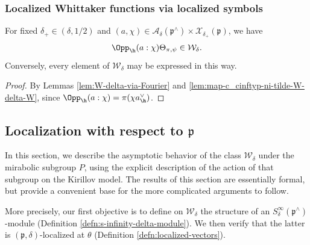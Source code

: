 \subsubsection{Localized Whittaker functions via localized symbols}

\begin{lemma}\label{lem:every-elem-mathc}
  For fixed $\delta_+ \in (\delta,1/2)$ and $(a,\chi) \in \mathcal{A}_\delta(\mathfrak{p}^\wedge) \times \mathcal{X}_{\delta_+}(\mathfrak{p})$, we have
  \begin{equation*}
    \Opp_{\h}(a:\chi) \Theta_{\pi,\psi} \in \mathcal{W}_\delta.
  \end{equation*}
  Conversely, every element of $\mathcal{W}_\delta$ may be expressed in this way.
\end{lemma}
\begin{proof}
  By Lemmas \ref{lem:W-delta-via-Fourier} and \ref{lem:map-c_cinftyp-ni-tilde-W-delta-W}, since $\Opp_{\h}(a : \chi) = \pi(\chi a_{\h}^\vee)$.
\end{proof}



\subsection{Localization with respect to $\mathfrak{p}$}\label{sec:local-with-resp-P}
In this section, we describe the asymptotic behavior of the class $\mathcal{W}_\delta$ under the mirabolic subgroup $P$, using the explicit description of the action of that subgroup on the Kirillov model.  The results of this section are essentially formal, but provide a convenient base for the more complicated arguments to follow.

More precisely, our first objective is to define on $\mathcal{W}_\delta$ the structure of an $S^\infty_\delta(\mathfrak{p}^\wedge)$-module (Definition \ref{defn:s-infinity-delta-module}).  We then verify that the latter is $(\mathfrak{p},\delta)$-localized at $\theta$ (Definition \ref{defn:localized-vectors}).

